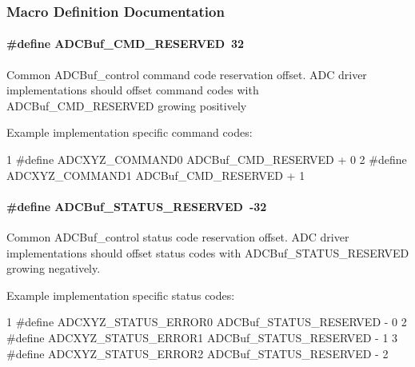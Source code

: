 \subsubsection{Macro Definition Documentation}
\paragraph[{A\+D\+C\+Buf\+\_\+\+C\+M\+D\+\_\+\+R\+E\+S\+E\+R\+V\+E\+D}]{\setlength{\rightskip}{0pt plus 5cm}\#define A\+D\+C\+Buf\+\_\+\+C\+M\+D\+\_\+\+R\+E\+S\+E\+R\+V\+E\+D~32}\label{_a_d_c_buf_8h_a6d889e191027535ad318be0b9c3765d1}
Common A\+D\+C\+Buf\+\_\+control command code reservation offset. A\+D\+C driver implementations should offset command codes with A\+D\+C\+Buf\+\_\+\+C\+M\+D\+\_\+\+R\+E\+S\+E\+R\+V\+E\+D growing positively

Example implementation specific command codes\+: 
\begin{DoxyCode}
1 #define ADCXYZ\_COMMAND0         ADCBuf\_CMD\_RESERVED + 0
2 #define ADCXYZ\_COMMAND1         ADCBuf\_CMD\_RESERVED + 1
\end{DoxyCode}
\paragraph[{A\+D\+C\+Buf\+\_\+\+S\+T\+A\+T\+U\+S\+\_\+\+R\+E\+S\+E\+R\+V\+E\+D}]{\setlength{\rightskip}{0pt plus 5cm}\#define A\+D\+C\+Buf\+\_\+\+S\+T\+A\+T\+U\+S\+\_\+\+R\+E\+S\+E\+R\+V\+E\+D~-\/32}\label{_a_d_c_buf_8h_a61f0abe91c78f6ab7003c53e513d4d3b}
Common A\+D\+C\+Buf\+\_\+control status code reservation offset. A\+D\+C driver implementations should offset status codes with A\+D\+C\+Buf\+\_\+\+S\+T\+A\+T\+U\+S\+\_\+\+R\+E\+S\+E\+R\+V\+E\+D growing negatively.

Example implementation specific status codes\+: 
\begin{DoxyCode}
1 #define ADCXYZ\_STATUS\_ERROR0    ADCBuf\_STATUS\_RESERVED - 0
2 #define ADCXYZ\_STATUS\_ERROR1    ADCBuf\_STATUS\_RESERVED - 1
3 #define ADCXYZ\_STATUS\_ERROR2    ADCBuf\_STATUS\_RESERVED - 2
\end{DoxyCode}
